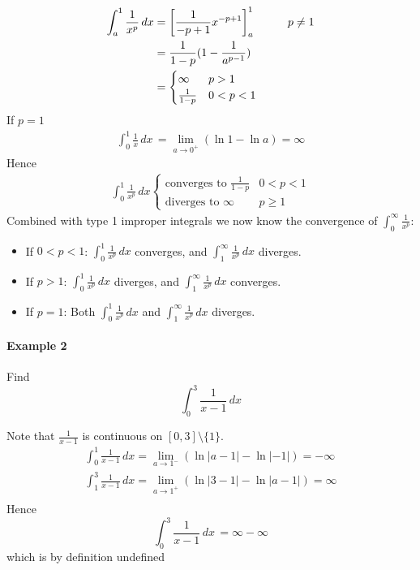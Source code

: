 \documentclass[12pt]{article}
\newcommand\tab[1][1cm]{\hspace*{#1}}
\begin{document}
\begin{align*} 
     \int_a^1 \frac{1}{x^p} \, dx &= \left[\frac{1}{ - p + 1} x^{ - p +1} \right]_a^1 \textrm{\tab } p \neq 1 \\
    &= \frac{1}{1 - p}(1 - \frac{1}{a^{p - 1}}) \\
    &= \begin{cases} 
        \infty & p > 1 \\
        \frac{1}{1 - p} & 0 < p < 1
    \end{cases} 
\end{align*}
If $p = 1$
\begin{align*} 
    \int_0^1 \frac{1}{x} \, dx\, = \lim_{a \to 0^+} (\ln 1 - \ln a) = \infty
\end{align*}
Hence
\begin{align*} 
    \int_0^1 \frac{1}{x^p} \, dx \begin{cases} 
        \textrm{converges to  } \frac{1}{1 - p} & 0 < p <1 \\
        \textrm{diverges to } \infty & p \geq 1
    \end{cases} 
\end{align*}
Combined with type 1 improper integrals we now know the convergence of $\int_0^{\infty} \frac{1}{x^p}$:
\begin{itemize} 
    \item If $0 < p < 1$: $\int_0^1 \frac{1}{x^p} \, dx$ converges, and $\int_1^{\infty} \frac{1}{x^p} \, dx$ diverges.
    \item If $p > 1$: $\int_0^1 \frac{1}{x^p} \, dx$ diverges, and $\int_1^{\infty} \frac{1}{x^p} \, dx$ converges.
    \item If $p = 1$: Both $\int_0^1 \frac{1}{x^p} \, dx$ and $\int_1^{\infty} \frac{1}{x^p} \, dx$ diverges.
\end{itemize}

\paragraph{Example 2} Find
\[
    \int_0^3 \frac{1}{x - 1} \, dx 
\]

Note that $\frac{1}{x-1}$ is continuous on $[0, 3] \setminus \{1\}$.
\begin{align*} 
     \int_0^1 \frac{1}{x - 1} \, dx = \lim_{a \to 1^{ -}} (\ln |a - 1| - \ln |- 1|) = - \infty \\
     \int_1^3 \frac{1}{x - 1} \, dx = \lim_{a \to 1^{ +}} (\ln |3 - 1| - \ln |a - 1|) = \infty \\
\end{align*}
Hence
\[
    \int_0^3 \frac{1}{x - 1} \, dx\, = \infty - \infty 
\]
which is by definition undefined
\end{document}
